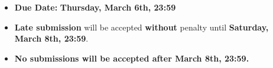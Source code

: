 \documentclass[11pt]{article}
\begin{document}
    \setlength{\headheight}{26pt}
    \pagestyle{fancy}
    \fancyfoot[C]{}
    \fancyfoot[R]{\thepage}
    \renewcommand{\headrulewidth}{0.4pt}
    \renewcommand{\footrulewidth}{0.4pt}
    

    \begin{itemize}
    \item \textbf{Due Date:} \textbf{Thursday, March 6th, 23:59}
    \item \textbf{Late submission} will be accepted \textbf{without} penalty until \textbf{Saturday, March 8th, 23:59}.
    \item \textbf{No submissions will be accepted after March 8th, 23:59.}
    \end{itemize}
\end{document}
